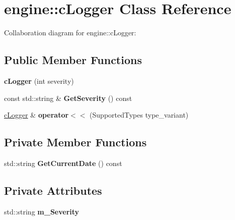 \hypertarget{classengine_1_1cLogger}{\section{engine\-:\-:c\-Logger Class Reference}
\label{classengine_1_1cLogger}
}


Collaboration diagram for engine\-:\-:c\-Logger\-:
\subsection*{Public Member Functions}
\begin{DoxyCompactItemize}
\item 
\hypertarget{classengine_1_1cLogger_a127edc3f43400830cc8b46a1ccd5d183}{{\bfseries c\-Logger} (int severity)}\label{classengine_1_1cLogger_a127edc3f43400830cc8b46a1ccd5d183}

\item 
\hypertarget{classengine_1_1cLogger_a1473c1a79b0e677476da12f457fd8ff6}{const std\-::string \& {\bfseries Get\-Severity} () const }\label{classengine_1_1cLogger_a1473c1a79b0e677476da12f457fd8ff6}

\item 
\hypertarget{classengine_1_1cLogger_afaad3dca17bb3dd399d379e2ddd114b2}{\hyperlink{classengine_1_1cLogger}{c\-Logger} \& {\bfseries operator$<$$<$} (Supported\-Types type\-\_\-variant)}\label{classengine_1_1cLogger_afaad3dca17bb3dd399d379e2ddd114b2}

\end{DoxyCompactItemize}
\subsection*{Private Member Functions}
\begin{DoxyCompactItemize}
\item 
\hypertarget{classengine_1_1cLogger_a62d0c265a5fc3b81f8d31868edc34834}{std\-::string {\bfseries Get\-Current\-Date} () const }\label{classengine_1_1cLogger_a62d0c265a5fc3b81f8d31868edc34834}

\end{DoxyCompactItemize}
\subsection*{Private Attributes}
\begin{DoxyCompactItemize}
\item 
\hypertarget{classengine_1_1cLogger_a8214e9c0a088dbb98a4f4ea7ca9b9351}{std\-::string {\bfseries m\-\_\-\-Severity}}\label{classengine_1_1cLogger_a8214e9c0a088dbb98a4f4ea7ca9b9351}

\end{DoxyCompactItemize}
